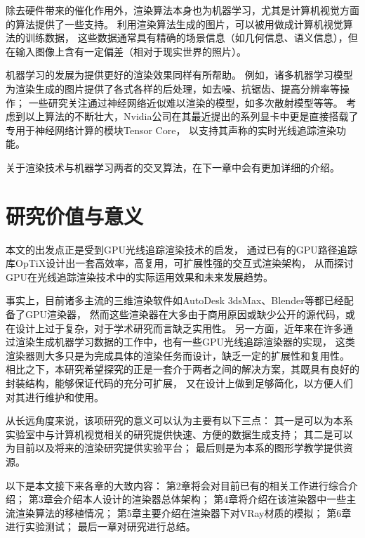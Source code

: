 除去硬件带来的催化作用外，渲染算法本身也为机器学习，尤其是计算机视觉方面的算法提供了一些支持。
利用渲染算法生成的图片，可以被用做成计算机视觉算法的训练数据，
这些数据通常具有精确的场景信息（如几何信息、语义信息），但在输入图像上含有一定偏差（相对于现实世界的照片）。

机器学习的发展为提供更好的渲染效果同样有所帮助。
例如，诸多机器学习模型为渲染生成的图片提供了各式各样的后处理，如去噪、抗锯齿、提高分辨率等操作；
一些研究关注通过神经网络近似难以渲染的模型，如多次散射模型等等。
考虑到以上算法的不断壮大，Nvidia公司在其最近提出的系列显卡中更是直接搭载了专用于神经网络计算的模块Tensor Core，
以支持其声称的实时光线追踪渲染功能。

关于渲染技术与机器学习两者的交叉算法，在下一章中会有更加详细的介绍。

\section{研究价值与意义}

本文的出发点正是受到GPU光线追踪渲染技术的启发，
通过已有的GPU路径追踪库OpTiX设计出一套高效率，高复用，可扩展性强的交互式渲染架构，
从而探讨GPU在光线追踪渲染技术中的实际运用效果和未来发展趋势。

事实上，目前诸多主流的三维渲染软件如AutoDesk 3dsMax、Blender等都已经配备了GPU渲染器，
然而这些渲染器在大多由于商用原因或缺少公开的源代码，或在设计上过于复杂，对于学术研究而言缺乏实用性。
另一方面，近年来在许多通过渲染生成机器学习数据的工作中，也有一些GPU光线追踪渲染器的实现，
这类渲染器则大多只是为完成具体的渲染任务而设计，缺乏一定的扩展性和复用性。
相比之下，本研究希望探究的正是一套介于两者之间的解决方案，其既具有良好的封装结构，能够保证代码的充分可扩展，
又在设计上做到足够简化，以方便人们对其进行维护和使用。

从长远角度来说，该项研究的意义可以认为主要有以下三点：
其一是可以为本系实验室中与计算机视觉相关的研究提供快速、方便的数据生成支持；
其二是可以为目前以及将来的渲染研究提供实验平台；
最后则是为本系的图形学教学提供资源。

以下是本文接下来各章的大致内容：
第2章将会对目前已有的相关工作进行综合介绍；
第3章会介绍本人设计的渲染器总体架构；
第4章将介绍在该渲染器中一些主流渲染算法的移植情况；
第5章主要介绍在渲染器下对VRay材质的模拟；
第6章进行实验测试；
最后一章对研究进行总结。






